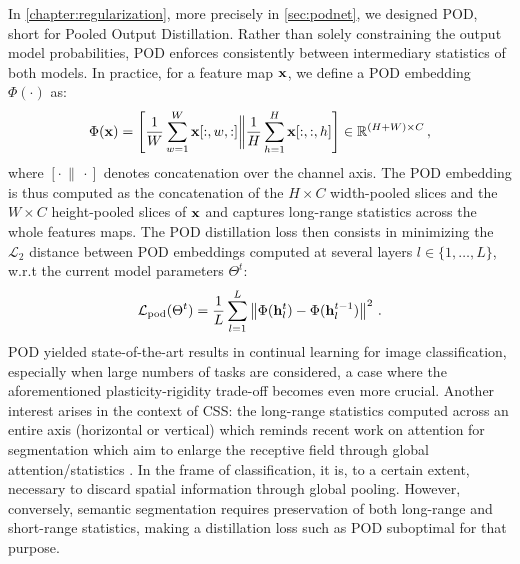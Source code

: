 In \autoref{chapter:regularization}, more precisely in \autoref{sec:podnet}, we designed POD, short
for Pooled Output Distillation. Rather than solely constraining the output model probabilities, POD
enforces consistently between intermediary statistics of both models. In practice, for a feature map
$\mathbf{x}$, we define a POD embedding $\Phi(\cdot)$ as:
%
\begin{equation}
    \Phi(\mathbf{x}) = \left[\frac{1}{W} \sum_{w=1}^W \mathbf{x}[:,w,:] \bigg\Vert \frac{1}{H} \sum_{h=1}^H \mathbf{x}[:,:,h]\right] \in \mathbb{R}^{(H + W) \times C}\,,
    \label{eq:seg_pod_embedding}
\end{equation}
%
where $[\cdot\,\|\,\cdot]$ denotes concatenation over the channel axis. The POD embedding is thus
computed as the concatenation of the $H \times C$ width-pooled slices and the $W \times C$
height-pooled slices of $\mathbf{x}$ and captures long-range statistics across the whole features maps. The
POD distillation loss then consists in minimizing the $\mathcal{L}_2$ distance between POD
embeddings computed at several layers $l \in \{1, \dots, L\}$, w.r.t the current model parameters
$\Theta^t$:
%
\begin{equation}
    \mathcal{L}_\text{pod}(\Theta^t) = \frac{1}{L} \sum_{l = 1}^L \left\Vert  \Phi(\mathbf{h}^t_l) -  \Phi(\mathbf{h}^{t-1}_l) \right\Vert^2\,.
    \label{eq:seg_pod_loss}
\end{equation}
%
POD yielded state-of-the-art results in continual learning for image classification, especially when
large numbers of tasks are considered, a case where the aforementioned plasticity-rigidity trade-off
becomes even more crucial. Another interest arises in the context of \ac{CSS}: the long-range statistics
computed across an entire axis (horizontal or vertical) which reminds recent work on attention for
segmentation \citep{wang2020axialdeeplab,huang2020ccnet,park2020csc} which aim to enlarge the
receptive field through global attention/statistics \citep{wang2020axialdeeplab}. In the frame of
classification, it is, to a certain extent, necessary to discard spatial information through global
pooling. However, conversely, semantic segmentation requires preservation of both long-range and
short-range statistics, making a distillation loss such as POD suboptimal for that purpose.


